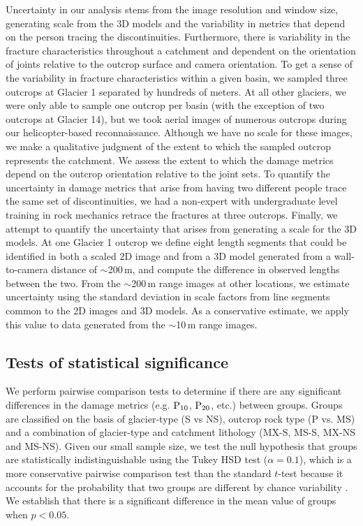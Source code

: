 \documentclass[review]{igs}
\begin{document}
Uncertainty in our analysis stems from the image resolution and window size, generating scale from the 3D models and the variability in metrics that depend on the person tracing the discontinuities. Furthermore, there is variability in the fracture characteristics throughout a catchment and dependent on the orientation of joints relative to the outcrop surface and camera orientation. To get a sense of the variability in fracture characteristics within a given basin, we sampled three outcrops at Glacier 1 separated by hundreds of meters. At all other glaciers, we were only able to sample one outcrop per basin (with the exception of two outcrops at Glacier 14), but we took aerial images of numerous outcrops during our helicopter-based reconnaissance. Although we have no scale for these images, we make a qualitative judgment of the extent to which the sampled outcrop represents the catchment. We assess the extent to which the damage metrics depend on the outcrop orientation relative to the joint sets. To quantify the uncertainty in damage metrics that arise from having two different people trace the same set of discontinuities, we had a non-expert with undergraduate level training in rock mechanics retrace the fractures at three outcrops. Finally, we attempt to quantify the uncertainty that arises from generating a scale for the 3D models. At one Glacier 1 outcrop we define eight length segments that could be identified in both a scaled 2D image and from a 3D model generated from a wall-to-camera distance of $\sim$200\,m, and compute the difference in observed lengths between the two. From the $\sim$200\,m range images at other locations, we estimate uncertainty using the standard deviation in scale factors from line segments common to the 2D images and 3D models. As a conservative estimate, we apply this value to data generated from the $\sim$10\,m range images. 

\subsection{Tests of statistical significance}

We perform pairwise comparison tests to determine if there are any significant differences in the damage metrics (e.g. $\rm P_{10}$, $\rm P_{20}$, etc.) between groups. Groups are classified on the basis of glacier-type (S vs NS), outcrop rock type (P vs. MS) and a combination of glacier-type and catchment lithology (MX-S, MS-S, MX-NS and MS-NS). Given our small sample size, we test the null hypothesis that groups are statistically indistinguishable using the Tukey HSD test ($\alpha = 0.1$), which is a more conservative pairwise comparison test than the standard $t$-test because it accounts for the probability that two groups are different by chance variability \citep{Dowdy2011}. We establish that there is a significant difference in the mean value of groups when $p<0.05$.
\end{document}

